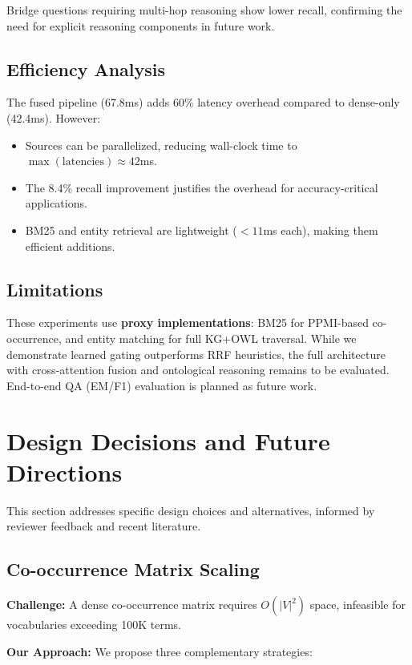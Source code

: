 \documentclass[11pt,a4paper]{article}
\begin{document}
Bridge questions requiring multi-hop reasoning show lower recall, confirming the need for explicit reasoning components in future work.

\subsection{Efficiency Analysis}

The fused pipeline (67.8ms) adds 60\% latency overhead compared to dense-only (42.4ms). However:
\begin{itemize}
    \item Sources can be parallelized, reducing wall-clock time to $\max(\text{latencies}) \approx 42$ms.
    \item The 8.4\% recall improvement justifies the overhead for accuracy-critical applications.
    \item BM25 and entity retrieval are lightweight ($<11$ms each), making them efficient additions.
\end{itemize}

\subsection{Limitations}

These experiments use \textbf{proxy implementations}: BM25 for PPMI-based co-occurrence, and entity matching for full KG+OWL traversal. While we demonstrate learned gating outperforms RRF heuristics, the full architecture with cross-attention fusion and ontological reasoning remains to be evaluated. End-to-end QA (EM/F1) evaluation is planned as future work.

\section{Design Decisions and Future Directions}
\label{sec:design_decisions}

This section addresses specific design choices and alternatives, informed by reviewer feedback and recent literature.

\subsection{Co-occurrence Matrix Scaling}
\label{sec:cooccurrence_scaling}

\textbf{Challenge:} A dense co-occurrence matrix requires $O(|V|^2)$ space, infeasible for vocabularies exceeding 100K terms.

\textbf{Our Approach:} We propose three complementary strategies:
\end{document}
